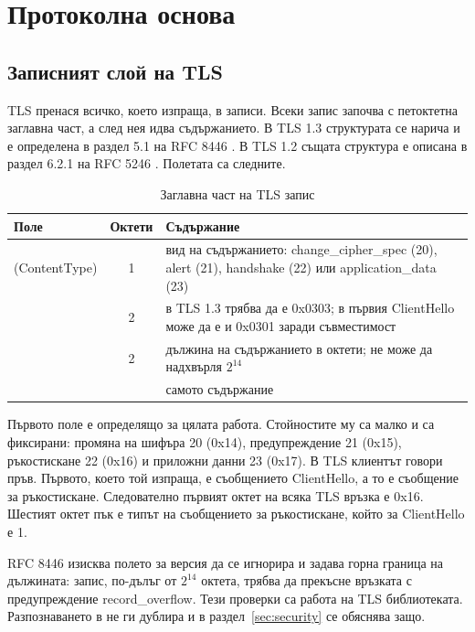 \section{Протоколна основа}
\label{sec:basis}

\subsection{Записният слой на TLS}

TLS пренася всичко, което изпраща, в записи. Всеки запис започва с петоктетна заглавна
част, а след нея идва съдържанието. В TLS 1.3 структурата се нарича 
и е определена в раздел 5.1 на RFC 8446 \cite{rfc8446}. В TLS 1.2 същата структура е
описана в раздел 6.2.1 на RFC 5246 \cite{rfc5246}. Полетата са следните.

\begin{table}[H]
\centering
\caption{Заглавна част на TLS запис}
\label{tab:record}
\begin{tabularx}{\textwidth}{@{}lcY@{}}
\toprule
Поле & Октети & Съдържание \\
\midrule
{} (ContentType) & 1 & вид на съдържанието: change\_cipher\_spec (20), alert (21),
  handshake (22) или application\_data (23) \\
 & 2 & в TLS 1.3 трябва да е 0x0303; в първия ClientHello
  може да е и 0x0301 заради съвместимост \\
 & 2 & дължина на съдържанието в октети; не може да надхвърля $2^{14}$ \\
 &  & самото съдържание \\
\bottomrule
\end{tabularx}
\end{table}

Първото поле е определящо за цялата работа. Стойностите му са малко и са фиксирани:
промяна на шифъра 20 (0x14), предупреждение 21 (0x15), ръкостискане 22 (0x16) и
приложни данни 23 (0x17). В TLS клиентът говори пръв. Първото, което той изпраща, е
съобщението ClientHello, а то е съобщение за ръкостискане. Следователно първият октет на
всяка TLS връзка е 0x16. Шестият октет пък е типът на съобщението за ръкостискане, който
за ClientHello е 1.

RFC 8446 изисква полето за версия да се игнорира и задава горна граница на дължината:
запис, по-дълъг от $2^{14}$ октета, трябва да прекъсне връзката с предупреждение
record\_overflow. Тези проверки са работа на TLS библиотеката. Разпознаването в
 не ги дублира и в раздел~\ref{sec:security} се обяснява защо.

